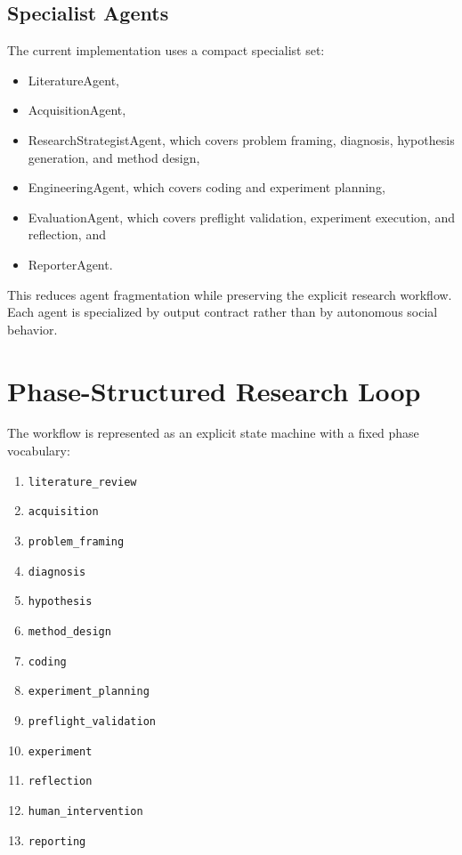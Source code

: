 \documentclass[11pt]{article}
\begin{document}
\subsection{Specialist Agents}
The current implementation uses a compact specialist set:
\begin{itemize}[leftmargin=1.5em]
  \item LiteratureAgent,
  \item AcquisitionAgent,
  \item ResearchStrategistAgent, which covers problem framing, diagnosis, hypothesis generation, and method design,
  \item EngineeringAgent, which covers coding and experiment planning,
  \item EvaluationAgent, which covers preflight validation, experiment execution, and reflection, and
  \item ReporterAgent.
\end{itemize}

This reduces agent fragmentation while preserving the explicit research workflow. Each agent is specialized by output contract rather than by autonomous social behavior.

\section{Phase-Structured Research Loop}
The workflow is represented as an explicit state machine with a fixed phase vocabulary:
\begin{enumerate}[leftmargin=1.5em]
  \item \texttt{literature\_review}
  \item \texttt{acquisition}
  \item \texttt{problem\_framing}
  \item \texttt{diagnosis}
  \item \texttt{hypothesis}
  \item \texttt{method\_design}
  \item \texttt{coding}
  \item \texttt{experiment\_planning}
  \item \texttt{preflight\_validation}
  \item \texttt{experiment}
  \item \texttt{reflection}
  \item \texttt{human\_intervention}
  \item \texttt{reporting}
\end{enumerate}
\end{document}

